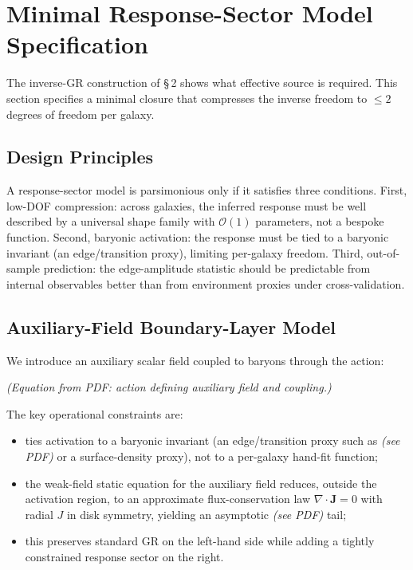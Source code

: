 \section{Minimal Response-Sector Model Specification}


The inverse-GR construction of \S\,2 shows what effective source is required. This section specifies a minimal closure that compresses the inverse freedom to $\le 2$ degrees of freedom per galaxy.

\subsection{Design Principles}
A response-sector model is parsimonious only if it satisfies three conditions. First, low-DOF compression: across galaxies, the inferred response must be well described by a universal shape family with $\mathcal{O}(1)$ parameters, not a bespoke function. Second, baryonic activation: the response must be tied to a baryonic invariant (an edge/transition proxy), limiting per-galaxy freedom. Third, out-of-sample prediction: the edge-amplitude statistic should be predictable from internal observables better than from environment proxies under cross-validation.

\subsection{Auxiliary-Field Boundary-Layer Model}
We introduce an auxiliary scalar field coupled to baryons through the action:

\emph{(Equation from PDF: action defining auxiliary field and coupling.)}

The key operational constraints are:

\begin{itemize}
\item ties activation to a baryonic invariant (an edge/transition proxy such as \emph{(see PDF)} or a surface-density proxy), not to a per-galaxy hand-fit function;
\item the weak-field static equation for the auxiliary field reduces, outside the activation region, to an approximate flux-conservation law $\nabla\cdot \bm{J}=0$ with radial $J$ in disk symmetry, yielding an asymptotic \emph{(see PDF)} tail;
\item this preserves standard GR on the left-hand side while adding a tightly constrained response sector on the right.
\end{itemize}

